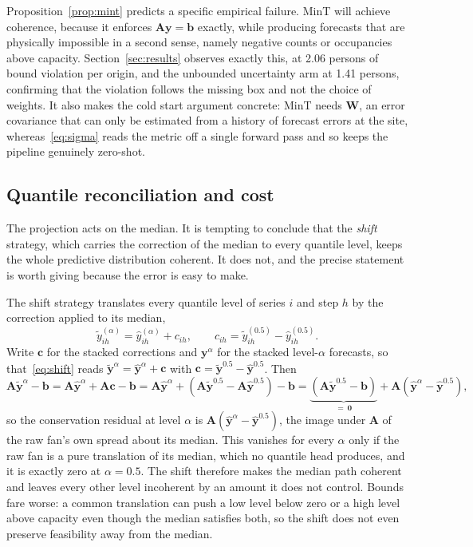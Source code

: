 \documentclass[utf8]{FrontiersinHarvard}
\newif\ifrevisionmarkup
\newcommand{\new}[1]{\ifrevisionmarkup\textcolor{revision}{#1}\else#1\fi}
\newif\ifsecondrevisionmarkup
\newcommand{\rev}[1]{\ifsecondrevisionmarkup\textcolor{revisiontwo}{#1}\else#1\fi}
\theoremstyle{plain}
\theoremstyle{definition}
\theoremstyle{remark}
\newcommand{\bA}{\bm{A}}
\newcommand{\by}{\bm{y}}
\newcommand{\bb}{\bm{b}}
\newcommand{\yhat}{\hat{\by}}
\newcommand{\ytil}{\tilde{\by}}
\begin{document}
Proposition~\ref{prop:mint} predicts a specific empirical failure. MinT will achieve coherence, because it enforces $\bA\by=\bb$ exactly, while producing forecasts that are physically impossible in a second sense, namely negative counts or occupancies above capacity. Section~\ref{sec:results} observes exactly this, at \new{\num{2.06}} persons of bound violation per origin\new{, and the unbounded uncertainty arm at \num{1.41} persons, confirming that the violation follows the missing box and not the choice of weights}. It also makes the cold start argument concrete: MinT needs $\bm{W}$, an error covariance that can only be estimated from a history of forecast errors at the site, whereas~\eqref{eq:sigma} reads the metric off a single forward pass and so keeps the pipeline genuinely zero-shot.

\subsection{Quantile reconciliation and cost}

The projection acts on the median. \rev{It is tempting to conclude that the \emph{shift} strategy, which carries the correction of the median to every quantile level, keeps the whole predictive distribution coherent. It does not, and the precise statement is worth giving because the error is easy to make.}

The shift strategy translates every quantile level of series $i$ and step $h$ by the correction applied to its median,
\begin{equation}
\tilde{y}^{(\alpha)}_{ih} = \hat{y}^{(\alpha)}_{ih} + c_{ih},
\qquad
c_{ih} = \tilde{y}^{(0.5)}_{ih} - \hat{y}^{(0.5)}_{ih}.
\label{eq:shift}
\end{equation}
\new{Write $\bm{c}$ for the stacked corrections and $\by^{\alpha}$ for the stacked level-$\alpha$ forecasts, so that~\eqref{eq:shift} reads $\ytil^{\alpha} = \yhat^{\alpha} + \bm{c}$ with $\bm{c} = \ytil^{0.5} - \yhat^{0.5}$. Then}
\new{\begin{equation}
\bA\ytil^{\alpha} - \bb
= \bA\yhat^{\alpha} + \bA\bm{c} - \bb
= \bA\yhat^{\alpha} + \left(\bA\ytil^{0.5} - \bA\yhat^{0.5}\right) - \bb
= \underbrace{\left(\bA\ytil^{0.5} - \bb\right)}_{=\,\bm{0}} + \bA\left(\yhat^{\alpha} - \yhat^{0.5}\right),
\label{eq:shiftresidual}
\end{equation}}
\new{so the conservation residual at level $\alpha$ is $\bA(\yhat^{\alpha} - \yhat^{0.5})$, the image under $\bA$ of the raw fan's own spread about its median. This vanishes for every $\alpha$ only if the raw fan is a pure translation of its median, which no quantile head produces, and it is exactly zero at $\alpha = 0.5$. The shift therefore makes the median path coherent and leaves every other level incoherent by an amount it does not control. Bounds fare worse: a common translation can push a low level below zero or a high level above capacity even though the median satisfies both, so the shift does not even preserve feasibility away from the median.}
\end{document}
